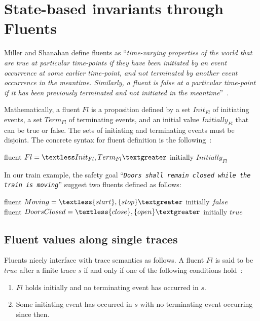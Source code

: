 \section{State-based invariants through Fluents\label{section:background-fluents}}

Miller and Shanahan define fluents as ``\emph{time-varying properties of the world that are true at particular time-points if they have been initiated by an event occurrence at some earlier time-point, and not terminated by another event occurrence in the meantime. Similarly, a fluent is false at a particular time-point if it has been previously terminated and not initiated in the meantime}''~\cite{Miller:2002}.

Mathematically, a fluent $Fl$ is a proposition defined by a set $Init_{Fl}$ of initiating events, a set $Term_{Fl}$ of terminating events, and an initial value $Initially_{Fl}$ that can be true or false. The sets of initiating and terminating events must be disjoint. The concrete syntax for fluent definition is the following~\cite{Giannakopoulou:2003}:

\begin{center}
fluent $Fl = \textless Init_{Fl}, Term_{Fl} \textgreater $ initially $Initially_{Fl}$
\end{center}

In our train example, the safety goal ``\emph{\texttt{Doors shall remain closed while the train is moving}}'' suggest two fluents defined as follows:

\begin{center}
fluent $Moving = \textless \{start\}, \{stop\} \textgreater $ initially $false$ \\
fluent $DoorsClosed = \textless \{close\}, \{open\} \textgreater $ initially $true$ \\
\end{center}

\subsection{Fluent values along single traces}

Fluents nicely interface with trace semantics as follows. A fluent $Fl$ is said to be $true$ after a finite trace $s$ if and only if one of the following conditions hold~\cite{Giannakopoulou:2003}:

\begin{enumerate}
\item $Fl$ holds initially and no terminating event has occurred in $s$.
\item Some initiating event has occurred in $s$ with no terminating event occurring since then.
\end{enumerate}

